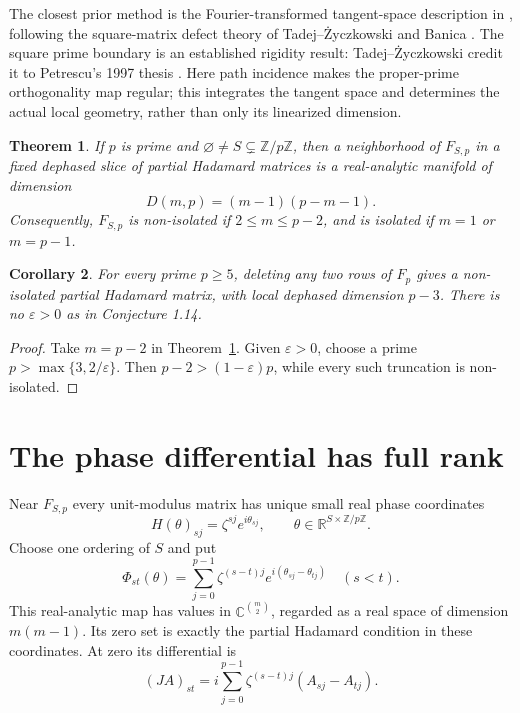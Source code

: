 \documentclass[11pt]{article}
\newtheorem{theorem}{Theorem}
\newtheorem{corollary}[theorem]{Corollary}
\newcommand{\R}{\mathbb R}
\newcommand{\C}{\mathbb C}
\newcommand{\Z}{\mathbb Z}
\begin{document}
The closest prior method is the Fourier-transformed tangent-space
description in \cite[Proposition~1.10 and Theorem~1.13]{BOP}, following
the square-matrix defect theory of Tadej--\.{Z}yczkowski
\cite[Theorems~5.2--5.3]{TZ} and Banica \cite[Theorem~4.2]{Defect}.
The square prime boundary is an established rigidity result:
Tadej--\.{Z}yczkowski credit it to Petrescu's 1997 thesis
\cite[Introduction and Section~5.1(i)]{TZ}.
Here path incidence makes the proper-prime orthogonality map regular;
this integrates the tangent space and determines the actual local
geometry, rather than only its linearized dimension.

\begin{theorem}\label{thm:dimension}
If $p$ is prime and $\varnothing\ne S\subsetneq\Z/p\Z$, then a neighborhood
of $F_{S,p}$ in a fixed dephased slice of partial Hadamard matrices is a
real-analytic manifold of dimension
\begin{equation}\label{eq:dimension}
D(m,p)=(m-1)(p-m-1).
\end{equation}
Consequently, $F_{S,p}$ is non-isolated if $2\leq m\leq p-2$, and is
isolated if $m=1$ or $m=p-1$.
\end{theorem}

\begin{corollary}\label{cor:counterexample}
For every prime $p\geq5$, deleting any two rows of $F_p$ gives a
non-isolated partial Hadamard matrix, with local dephased dimension $p-3$.
There is no $\varepsilon>0$ as in Conjecture 1.14.
\end{corollary}
\begin{proof}
Take $m=p-2$ in Theorem~\ref{thm:dimension}. Given $\varepsilon>0$, choose
a prime $p>\max\{3,2/\varepsilon\}$. Then $p-2>(1-\varepsilon)p$, while
every such truncation is non-isolated.
\end{proof}

\section{The phase differential has full rank}
Near $F_{S,p}$ every unit-modulus matrix has unique small real phase
coordinates
\[
H(\theta)_{sj}=\zeta^{sj}e^{i\theta_{sj}},\qquad\theta\in\R^{S\times\Z/p\Z}.
\]
Choose one ordering of $S$ and put
\[
\Phi_{st}(\theta)=\sum_{j=0}^{p-1}\zeta^{(s-t)j}
       e^{i(\theta_{sj}-\theta_{tj})}\quad(s<t).
\]
This real-analytic map has values in $\C^{\binom m2}$, regarded as a
real space of dimension $m(m-1)$. Its zero set is exactly the partial
Hadamard condition in these coordinates. At zero its differential is
\begin{equation}\label{eq:jacobian}
(J A)_{st}=i\sum_{j=0}^{p-1}\zeta^{(s-t)j}(A_{sj}-A_{tj}).
\end{equation}
\end{document}
